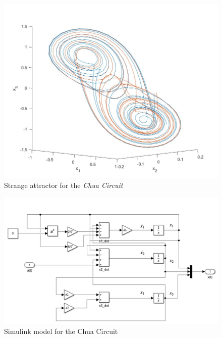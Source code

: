 \begin{figure}[h]
    \centering
    \includegraphics[scale=0.36]{NonLinearControl/images/chuaAttr.jpg}
    \caption{Strange attractor for the \textit{Chua Circuit }}
    \label{fig:enter-label}
\end{figure}

\begin{figure}[h]
    \centering
    \includegraphics[scale=0.5]{NonLinearControl/images/slk_model.png}
    \caption{Simulink model for the Chua Circuit}
    \label{fig:enter-label}
\end{figure}

